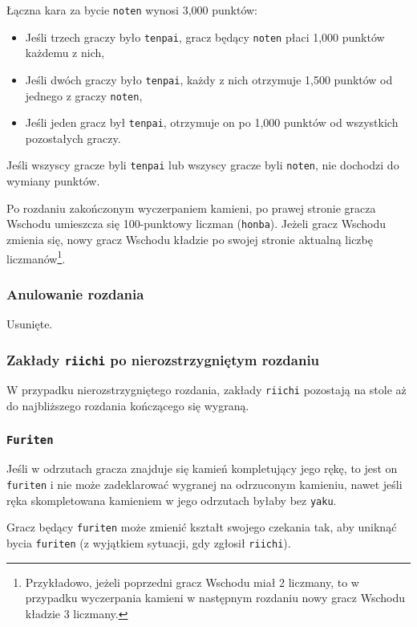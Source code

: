 Łączna kara za bycie \texttt{noten} wynosi 3,000 punktów:
\begin{itemize}
    \item Jeśli trzech graczy było \texttt{tenpai}, gracz będący \texttt{noten}
        płaci 1,000 punktów każdemu z nich,
    \item Jeśli dwóch graczy było \texttt{tenpai}, każdy z nich otrzymuje 1,500
        punktów od jednego z graczy \texttt{noten},
    \item Jeśli jeden gracz był \texttt{tenpai}, otrzymuje on po 1,000 punktów
        od wszystkich pozostałych graczy.
\end{itemize}

Jeśli wszyscy gracze byli \texttt{tenpai} lub wszyscy gracze byli
\texttt{noten}, nie dochodzi do wymiany punktów.

Po rozdaniu zakończonym wyczerpaniem kamieni, po prawej stronie gracza Wschodu
umieszcza się 100-punktowy liczman (\texttt{honba}).
Jeżeli gracz Wschodu zmienia się, nowy gracz Wschodu kładzie po swojej stronie
aktualną liczbę liczmanów\footnote{Przykładowo, jeżeli poprzedni gracz Wschodu
miał 2 liczmany, to w przypadku wyczerpania kamieni w następnym rozdaniu nowy
gracz Wschodu kładzie 3 liczmany.}.

\subsubsection{Anulowanie rozdania}
Usunięte.

\subsubsection{Zakłady \texttt{riichi} po nierozstrzygniętym rozdaniu}
W przypadku nierozstrzygniętego rozdania, zakłady \texttt{riichi} pozostają na
stole aż do najbliższego rozdania kończącego się wygraną.

\subsubsection{\texttt{Furiten}}
Jeśli w odrzutach gracza znajduje się kamień kompletujący jego rękę, to jest on
\texttt{furiten} i nie może zadeklarować wygranej na odrzuconym kamieniu, nawet
jeśli ręka skompletowana kamieniem w jego odrzutach byłaby bez \texttt{yaku}.

Gracz będący \texttt{furiten} może zmienić kształt swojego czekania tak, aby
uniknąć bycia \texttt{furiten} (z wyjątkiem sytuacji, gdy zgłosił
\texttt{riichi}).

